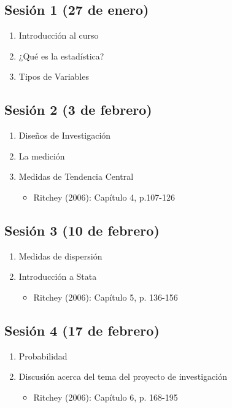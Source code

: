 \documentclass[letterpaper]{article}
\begin{document}
\subsection{Sesión 1 (27 de enero)}
\begin{enumerate}
	\item Introducción al curso
	\item ¿Qué es la estadística?
	\item Tipos de Variables

\end{enumerate}

\subsection{Sesión 2 (3 de febrero)}
\begin{enumerate}
\item Diseños de Investigación
\item La medición
\item Medidas de Tendencia Central

\begin{itemize}
	\item Ritchey (2006): Capítulo 4, p.107-126
\end{itemize}
\end{enumerate}

\subsection{Sesión 3 (10 de febrero)}
\begin{enumerate}
\item Medidas de dispersión
\item Introducción a Stata
\begin{itemize}
\item Ritchey (2006):
Capítulo 5, p.
136-156
\end{itemize}
\end{enumerate}

\subsection{Sesión 4 (17 de febrero)}
\begin{enumerate}
\item Probabilidad 
\item Discusión acerca del tema del proyecto de investigación
\begin{itemize}
\item Ritchey (2006):
Capítulo 6, p.
168-195
\end{itemize}
\end{enumerate}
\end{document}

